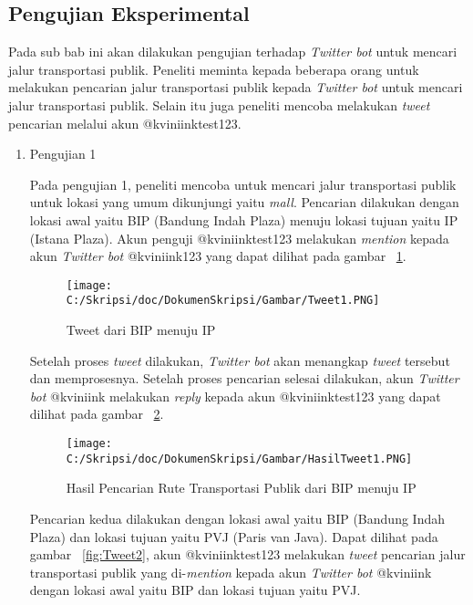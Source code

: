 \subsection{Pengujian Eksperimental}
Pada sub bab ini akan dilakukan pengujian terhadap \textit{Twitter bot} untuk mencari jalur transportasi publik. Peneliti meminta kepada beberapa orang untuk melakukan pencarian jalur transportasi publik kepada \textit{Twitter bot} untuk mencari jalur transportasi publik. Selain itu juga peneliti mencoba melakukan \textit{tweet} pencarian melalui akun @kviniinktest123.

\begin{enumerate}
	\item Pengujian 1
	
	Pada pengujian 1, peneliti mencoba untuk mencari jalur transportasi publik untuk lokasi yang umum dikunjungi yaitu \textit{mall}. Pencarian dilakukan dengan lokasi awal yaitu BIP (Bandung Indah Plaza) menuju lokasi tujuan yaitu IP (Istana Plaza). Akun penguji @kviniinktest123 melakukan \textit{mention} kepada akun \textit{Twitter bot} @kviniink123 yang dapat dilihat pada gambar ~\ref{fig:Tweet1}.
	
	\begin{figure}
		\centering
			\texttt{[image: C:/Skripsi/doc/DokumenSkripsi/Gambar/Tweet1.PNG]}
		\caption{Tweet dari BIP menuju IP}
		\label{fig:Tweet1}
	\end{figure}
	
	Setelah proses \textit{tweet} dilakukan, \textit{Twitter bot} akan menangkap \textit{tweet} tersebut dan memprosesnya. Setelah proses pencarian selesai dilakukan, akun \textit{Twitter bot} @kviniink melakukan \textit{reply} kepada akun @kviniinktest123 yang dapat dilihat pada gambar ~\ref{fig:HasilTweet1}. 
	
		
	\begin{figure}
		\centering
			\texttt{[image: C:/Skripsi/doc/DokumenSkripsi/Gambar/HasilTweet1.PNG]}
		\caption{Hasil Pencarian Rute Transportasi Publik dari BIP menuju IP}
		\label{fig:HasilTweet1}
	\end{figure}
	
	Pencarian kedua dilakukan dengan lokasi awal yaitu BIP (Bandung Indah Plaza) dan lokasi tujuan yaitu PVJ (Paris van Java). Dapat dilihat pada gambar ~\ref{fig:Tweet2}, akun @kviniinktest123 melakukan \textit{tweet} pencarian jalur transportasi publik yang di-\textit{mention} kepada akun \textit{Twitter bot} @kviniink dengan lokasi awal yaitu BIP dan lokasi tujuan yaitu PVJ.
	

\end{enumerate}
